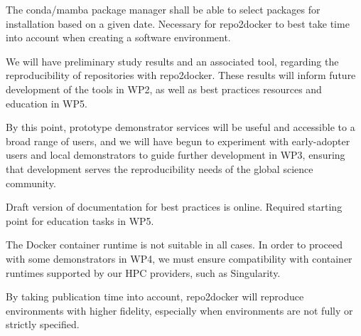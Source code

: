 \begin{milestones}
  {
  The conda/mamba package manager shall be able to
  select packages for installation based on a given date.
  Necessary for repo2docker to best take time into account
  when creating a software environment.
  }

  {
  We will have preliminary study results and an associated tool,
  regarding the reproducibility of repositories with repo2docker.
  These results will inform future development of the tools in WP2,
  as well as best practices resources and education in WP5.
  }

  {
  By this point, prototype demonstrator services will be useful and accessible
  to a broad range of users, and we will have begun to experiment with early-adopter
  users and local demonstrators to guide further development in WP3,
  ensuring that development serves the reproducibility needs of the global science community.
  }

  {
  Draft version of documentation for best practices is online.
  Required starting point for education tasks in WP5.
  }

  {
  The Docker container runtime is not suitable in all cases.
  In order to proceed with some demonstrators in WP4,
  we must ensure compatibility with container runtimes supported by our HPC providers,
  such as Singularity.
  }

  {
  By taking publication time into account,
  repo2docker will reproduce environments with higher fidelity,
  especially when environments are not fully or strictly specified.
  }


\end{milestones}
